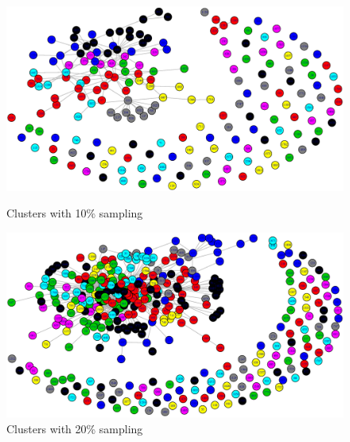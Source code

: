 \begin{figure}[htb]
\centering
\begin{minipage}{0.45\linewidth}
\includegraphics[scale=0.2]{Methods/10percent.eps}
\caption{Clusters with 10\% sampling}
\end{minipage}
\quad
\begin{minipage}{0.45\linewidth}
\includegraphics[scale=0.2]{Methods/20percent.eps}
\caption{Clusters with 20\% sampling}
\end{minipage}
\end{figure}
\pagebreak

